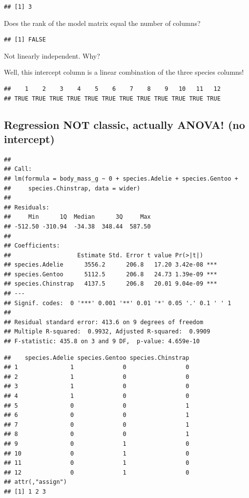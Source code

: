 \documentclass[
  openany]{book}
\begin{document}
\begin{verbatim}
## [1] 3
\end{verbatim}

Does the rank of the model matrix equal the number of columns?

\begin{verbatim}
## [1] FALSE
\end{verbatim}

Not linearly independent. Why?

Well, this intercept column is a linear combination of the three species columns!

\begin{verbatim}
##    1    2    3    4    5    6    7    8    9   10   11   12 
## TRUE TRUE TRUE TRUE TRUE TRUE TRUE TRUE TRUE TRUE TRUE TRUE
\end{verbatim}

\hypertarget{regression-not-classic-actually-anova-no-intercept}{%
\subsection{Regression NOT classic, actually ANOVA! (no intercept)}\label{regression-not-classic-actually-anova-no-intercept}}

\begin{verbatim}
## 
## Call:
## lm(formula = body_mass_g ~ 0 + species.Adelie + species.Gentoo + 
##     species.Chinstrap, data = wider)
## 
## Residuals:
##     Min      1Q  Median      3Q     Max 
## -512.50 -310.94  -34.38  348.44  587.50 
## 
## Coefficients:
##                   Estimate Std. Error t value Pr(>|t|)    
## species.Adelie      3556.2      206.8   17.20 3.42e-08 ***
## species.Gentoo      5112.5      206.8   24.73 1.39e-09 ***
## species.Chinstrap   4137.5      206.8   20.01 9.04e-09 ***
## ---
## Signif. codes:  0 '***' 0.001 '**' 0.01 '*' 0.05 '.' 0.1 ' ' 1
## 
## Residual standard error: 413.6 on 9 degrees of freedom
## Multiple R-squared:  0.9932, Adjusted R-squared:  0.9909 
## F-statistic: 435.8 on 3 and 9 DF,  p-value: 4.659e-10
\end{verbatim}

\begin{verbatim}
##    species.Adelie species.Gentoo species.Chinstrap
## 1               1              0                 0
## 2               1              0                 0
## 3               1              0                 0
## 4               1              0                 0
## 5               0              0                 1
## 6               0              0                 1
## 7               0              0                 1
## 8               0              0                 1
## 9               0              1                 0
## 10              0              1                 0
## 11              0              1                 0
## 12              0              1                 0
## attr(,"assign")
## [1] 1 2 3
\end{verbatim}
\end{document}
